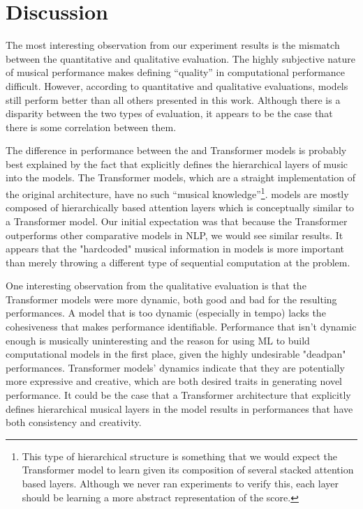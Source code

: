 \chapter{Discussion} \label{ch:ch7}
The most interesting observation from our experiment results is the mismatch between the quantitative and qualitative evaluation. The highly subjective nature of musical performance makes defining ``quality'' in computational performance difficult. However, according to quantitative and qualitative evaluations, \vnet{} models still perform better than all others presented in this work. Although there is a disparity between the two types of evaluation, it appears to be the case that there is some correlation between them. 

The difference in performance between the \vnet{} and Transformer models is probably best explained by the fact that \vnet{} explicitly defines the hierarchical layers of music into the models. The Transformer models, which are a straight implementation of the original architecture, have no such ``musical knowledge''\footnote{This type of hierarchical structure is something that we would expect the Transformer model to learn given its composition of several stacked attention based layers. Although we never ran experiments to verify this, each layer should be learning a more abstract representation of the score. }. \vnet{} models are mostly composed of hierarchically based attention layers which is conceptually similar to a Transformer model. Our initial expectation was that because the Transformer outperforms other comparative models in NLP, we would see similar results. It appears that the "hardcoded" musical information in \vnet{} models is more important than merely throwing a different type of sequential computation at the problem. 

One interesting observation from the qualitative evaluation is that the Transformer models were more dynamic, both good and bad for the resulting performances. A model that is too dynamic (especially in tempo) lacks the cohesiveness that makes performance identifiable. Performance that isn't dynamic enough is musically uninteresting and the reason for using ML to build computational models in the first place, given the highly undesirable "deadpan" performances. Transformer models' dynamics indicate that they are potentially more expressive and creative, which are both desired traits in generating novel performance. It could be the case that a Transformer architecture that explicitly defines hierarchical musical layers in the model results in performances that have both consistency and creativity. 

